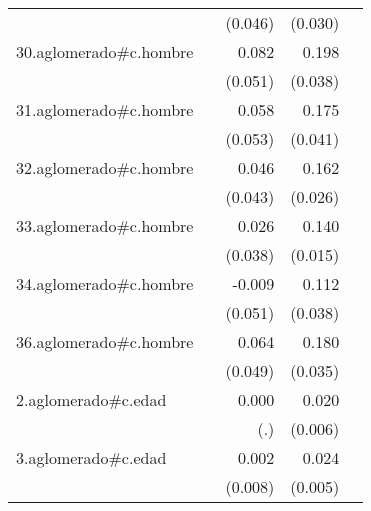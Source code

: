 {\begin{longtable}{l*{4}{D{.}{.}{-1}}}
            &                     &     (0.046)         &     (0.030)         &                     \\
\addlinespace
30.aglomerado#c.hombre&                     &       0.082         &       0.198\sym{***}&                     \\
            &                     &     (0.051)         &     (0.038)         &                     \\
\addlinespace
31.aglomerado#c.hombre&                     &       0.058         &       0.175\sym{***}&                     \\
            &                     &     (0.053)         &     (0.041)         &                     \\
\addlinespace
32.aglomerado#c.hombre&                     &       0.046         &       0.162\sym{***}&                     \\
            &                     &     (0.043)         &     (0.026)         &                     \\
\addlinespace
33.aglomerado#c.hombre&                     &       0.026         &       0.140\sym{***}&                     \\
            &                     &     (0.038)         &     (0.015)         &                     \\
\addlinespace
34.aglomerado#c.hombre&                     &      -0.009         &       0.112\sym{**} &                     \\
            &                     &     (0.051)         &     (0.038)         &                     \\
\addlinespace
36.aglomerado#c.hombre&                     &       0.064         &       0.180\sym{***}&                     \\
            &                     &     (0.049)         &     (0.035)         &                     \\
\addlinespace
2.aglomerado#c.edad&                     &       0.000         &       0.020\sym{**} &                     \\
            &                     &         (.)         &     (0.006)         &                     \\
\addlinespace
3.aglomerado#c.edad&                     &       0.002         &       0.024\sym{***}&                     \\
            &                     &     (0.008)         &     (0.005)         &                     \\

\end{longtable}}
